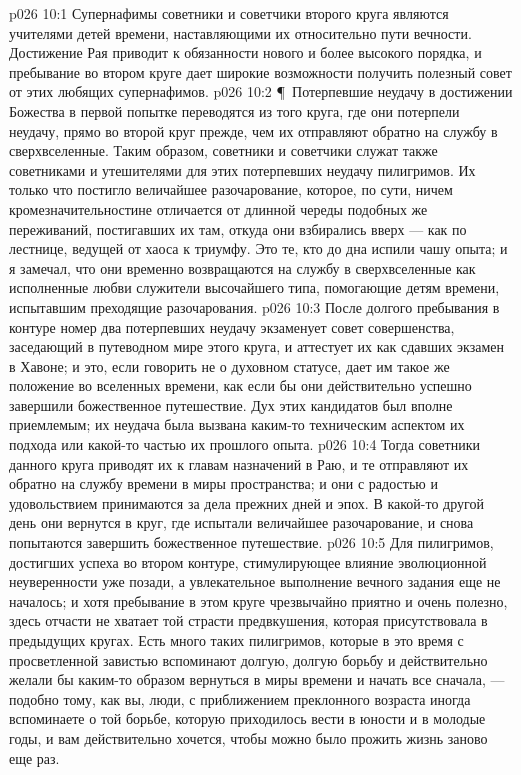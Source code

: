 \vs p026 10:1 Супернафимы советники и советчики второго круга являются учителями детей времени, наставляющими их относительно пути вечности. Достижение Рая приводит к обязанности нового и более высокого порядка, и пребывание во втором круге дает широкие возможности получить полезный совет от этих любящих супернафимов.
\vs p026 10:2 \P\ Потерпевшие неудачу в достижении Божества в первой попытке переводятся из того круга, где они потерпели неудачу, прямо во второй круг прежде, чем их отправляют обратно на службу в сверхвселенные. Таким образом, советники и советчики служат также советниками и утешителями для этих потерпевших неудачу пилигримов. Их только что постигло величайшее разочарование, которое, по сути, ничем кромезначительностине отличается от длинной череды подобных же переживаний, постигавших их там, откуда они взбирались вверх --- как по лестнице, ведущей от хаоса к триумфу. Это те, кто до дна испили чашу опыта; и я замечал, что они временно возвращаются на службу в сверхвселенные как исполненные любви служители высочайшего типа, помогающие детям времени, испытавшим преходящие разочарования.
\vs p026 10:3 После долгого пребывания в контуре номер два потерпевших неудачу экзаменует совет совершенства, заседающий в путеводном мире этого круга, и аттестует их как сдавших экзамен в Хавоне; и это, если говорить не о духовном статусе, дает им такое же положение во вселенных времени, как если бы они действительно успешно завершили божественное путешествие. Дух этих кандидатов был вполне приемлемым; их неудача была вызвана каким\hyp{}то техническим аспектом их подхода или какой\hyp{}то частью их прошлого опыта.
\vs p026 10:4 Тогда советники данного круга приводят их к главам назначений в Раю, и те отправляют их обратно на службу времени в миры пространства; и они с радостью и удовольствием принимаются за дела прежних дней и эпох. В какой\hyp{}то другой день они вернутся в круг, где испытали величайшее разочарование, и снова попытаются завершить божественное путешествие.
\vs p026 10:5 Для пилигримов, достигших успеха во втором контуре, стимулирующее влияние эволюционной неуверенности уже позади, а увлекательное выполнение вечного задания еще не началось; и хотя пребывание в этом круге чрезвычайно приятно и очень полезно, здесь отчасти не хватает той страсти предвкушения, которая присутствовала в предыдущих кругах. Есть много таких пилигримов, которые в это время с просветленной завистью вспоминают долгую, долгую борьбу и действительно желали бы каким\hyp{}то образом вернуться в миры времени и начать все сначала, --- подобно тому, как вы, люди, с приближением преклонного возраста иногда вспоминаете о той борьбе, которую приходилось вести в юности и в молодые годы, и вам действительно хочется, чтобы можно было прожить жизнь заново еще раз.
